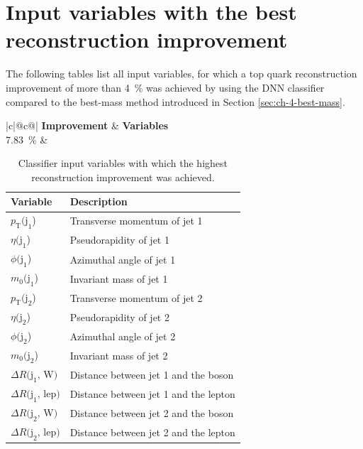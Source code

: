 \chapter{Input variables with the best reconstruction improvement}
\label{ch:appendix_a}
The following tables list all input variables, for which a top quark reconstruction improvement of more than \SI{4}{\%} was achieved by using the DNN classifier compared to the best-mass method introduced in Section \ref{sec:ch-4-best-mass}.

\begin{table}[h]
    \centering
    \label{tab:app_vars_1}
    \caption{Classifier input variables with which the highest reconstruction improvement was achieved.}
    \begin{tabular}{ |c|@{}c@{}| }
        \hline
        \textbf{Improvement} & \textbf{Variables}\\
        \hline
        \SI{7.83}{\%} & 
        \begin{tabular}{ll}
            \hline
            Variable & Description\\
            \hline
            $p_\text{T}\text{(j}_\text{1}$) & Transverse momentum of jet 1\\
            $\eta\text{(j}_\text{1}$) & Pseudorapidity of jet 1\\
            $\phi\text{(j}_\text{1}$) & Azimuthal angle of jet 1\\
            $m_0\text{(j}_\text{1}$) & Invariant mass of jet 1\\

            $p_\text{T}\text{(j}_\text{2}$) & Transverse momentum of jet 2\\
            $\eta\text{(j}_\text{2}$) & Pseudorapidity of jet 2\\
            $\phi\text{(j}_\text{2}$) & Azimuthal angle of jet 2\\
            $m_0\text{(j}_\text{2}$) & Invariant mass of jet 2\\

            $\Delta R \text{(j}_\text{1}\text{, W)}$ & Distance between jet 1 and the \PW boson\\
            $\Delta R \text{(j}_\text{1}\text{, lep)}$ & Distance between jet 1 and the lepton\\
            $\Delta R \text{(j}_\text{2}\text{, W)}$ & Distance between jet 2 and the \PW boson\\
            $\Delta R \text{(j}_\text{2}\text{, lep)}$ & Distance between jet 2 and the lepton\\
            \hline
        \end{tabular}\\
        \hline
    \end{tabular}
\end{table}

